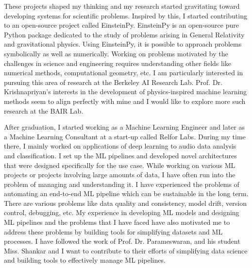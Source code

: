\documentclass[11pt]{article}
\begin{document}
These projects shaped my thinking and my research started gravitating toward
developing systems for scientific problems. Inspired by this, I started
contributing to an open-source project called EinsteinPy. EinsteinPy is an
open-source pure Python package dedicated to the study of problems arising in
General Relativity and gravitational physics. Using EinsteinPy, it is possible
to approach problems symbolically as well as numerically. Working on problems
motivated by the challenges in science and engineering requires understanding
other fields like numerical methods, computational geometry, etc. I am
particularly interested in pursuing this area of research at the Berkeley AI
Research Lab. Prof. Dr. Krishnapriyan’s interests in the development of
physics-inspired machine learning methods seem to align perfectly with mine and
I would like to explore more such research at the BAIR Lab.

After graduation, I started working as a Machine Learning Engineer and later as
a Machine Learning Consultant at a start-up called Relfor Labs. During my time
there, I mainly worked on applications of deep learning to audio data analysis
and classification. I set up the ML pipelines and developed novel architectures
that were designed specifically for the use case. While working on various ML
projects or projects involving large amounts of data, I have often run into the
problem of managing and understanding it. I have experienced the problems of
automating an end-to-end ML pipeline which can be sustainable in the long term.
There are various problems like data quality and consistency, model drift,
version control, debugging, etc. My experience in developing ML models and
designing ML pipelines and the problems that I have faced have also motivated me
to address these problems by building tools for simplifying datasets and ML
processes. I have followed the work of Prof. Dr. Parameswaran, and his student
Miss. Shankar and I want to contribute to their efforts of simplifying data
science and building tools to effectively manage ML pipelines. 
\end{document}
